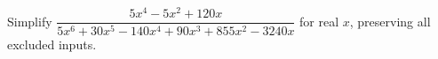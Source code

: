 Simplify $\dfrac{5x^4-5x^2+120x}{5x^6+30x^5-140x^4+90x^3+855x^2-3240x}$ for real $x$, preserving all excluded inputs.
